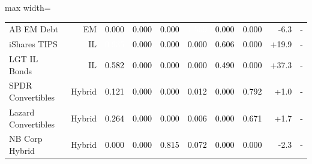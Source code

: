 \documentclass[a4paper,review]{cas-sc}
\begin{document}
\begin{table}[pos=htbp]
\begin{adjustbox}{max width=\linewidth}
\begin{tabular}{lrrrrrrrrr}
AB EM Debt & EM & \cellcolor[HTML]{FFFFFF}\textcolor{black}{0.000} & \cellcolor[HTML]{FFFFFF}\textcolor{black}{0.000} & \cellcolor[HTML]{FFFFFF}\textcolor{black}{0.000} & \cellcolor[HTML]{67001F}\textcolor{white}{1.569} & \cellcolor[HTML]{FFFFFF}\textcolor{black}{0.000} & \cellcolor[HTML]{FFFFFF}\textcolor{black}{0.000} & -6.3 & - \\
iShares TIPS & IL & \cellcolor[HTML]{D25849}\textcolor{white}{0.935} & \cellcolor[HTML]{FFFFFF}\textcolor{black}{0.000} & \cellcolor[HTML]{FFFFFF}\textcolor{black}{0.000} & \cellcolor[HTML]{FFFFFF}\textcolor{black}{0.000} & \cellcolor[HTML]{F3A481}\textcolor{black}{0.606} & \cellcolor[HTML]{FFFFFF}\textcolor{black}{0.000} & +19.9 & - \\
LGT IL Bonds & IL & \cellcolor[HTML]{F5A886}\textcolor{black}{0.582} & \cellcolor[HTML]{FFFFFF}\textcolor{black}{0.000} & \cellcolor[HTML]{FFFFFF}\textcolor{black}{0.000} & \cellcolor[HTML]{FFFFFF}\textcolor{black}{0.000} & \cellcolor[HTML]{F7B99C}\textcolor{black}{0.490} & \cellcolor[HTML]{FFFFFF}\textcolor{black}{0.000} & +37.3 & - \\
SPDR Convertibles & Hybrid & \cellcolor[HTML]{F9EBE3}\textcolor{black}{0.121} & \cellcolor[HTML]{FFFFFF}\textcolor{black}{0.000} & \cellcolor[HTML]{FFFFFF}\textcolor{black}{0.000} & \cellcolor[HTML]{F7F5F4}\textcolor{black}{0.012} & \cellcolor[HTML]{FFFFFF}\textcolor{black}{0.000} & \cellcolor[HTML]{E17860}\textcolor{black}{0.792} & +1.0 & - \\
Lazard Convertibles & Hybrid & \cellcolor[HTML]{FCDECD}\textcolor{black}{0.264} & \cellcolor[HTML]{FFFFFF}\textcolor{black}{0.000} & \cellcolor[HTML]{FFFFFF}\textcolor{black}{0.000} & \cellcolor[HTML]{F7F6F6}\textcolor{black}{0.006} & \cellcolor[HTML]{FFFFFF}\textcolor{black}{0.000} & \cellcolor[HTML]{EC9374}\textcolor{black}{0.671} & +1.7 & - \\
NB Corp Hybrid & Hybrid & \cellcolor[HTML]{FFFFFF}\textcolor{black}{0.000} & \cellcolor[HTML]{FFFFFF}\textcolor{black}{0.000} & \cellcolor[HTML]{DE735C}\textcolor{black}{0.815} & \cellcolor[HTML]{F9F0EB}\textcolor{black}{0.072} & \cellcolor[HTML]{FFFFFF}\textcolor{black}{0.000} & \cellcolor[HTML]{FFFFFF}\textcolor{black}{0.000} & -2.3 & - \\
\bottomrule
\end{tabular}
\end{adjustbox}
\end{table}
\end{document}
